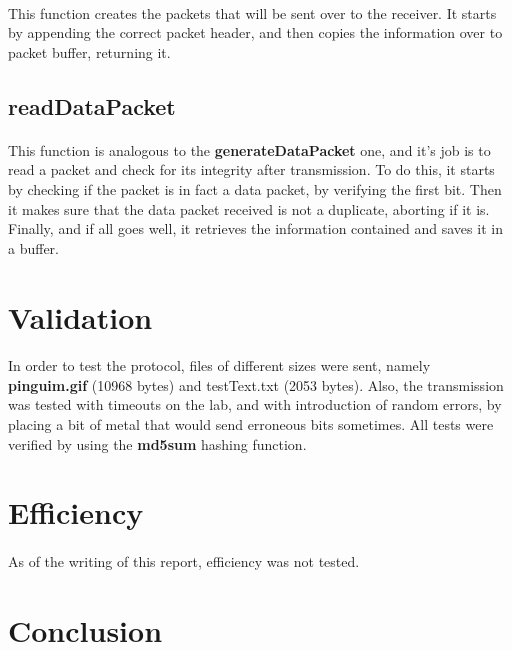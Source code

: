 \documentclass[11pt]{article}
\begin{document}
\paragraph{}This function creates the packets that will be sent over to the receiver. It starts by appending
the correct packet header, and then copies the information over to packet buffer, returning it.

\subsection*{readDataPacket}

\paragraph{}This function is analogous to the \textbf{generateDataPacket} one, and it's job is to read a
packet and check for its integrity after transmission. To do this, it starts by checking if the packet is in
fact a data packet, by verifying the first bit. Then it makes sure that the data packet received is not a
duplicate, aborting if it is. Finally, and if all goes well, it retrieves the information contained and saves
it in a buffer.

\section{Validation}

\paragraph{}In order to test the protocol, files of different sizes were sent, namely \textbf{pinguim.gif}
(10968 bytes) and testText.txt (2053 bytes). Also, the transmission was tested with timeouts
on the lab, and with introduction of random errors, by placing a bit of metal that would send erroneous bits
sometimes. All tests were verified by using the \textbf{md5sum} hashing function.

\section{Efficiency}

\paragraph{}As of the writing of this report, efficiency was not tested.

\section{Conclusion}
\end{document}
